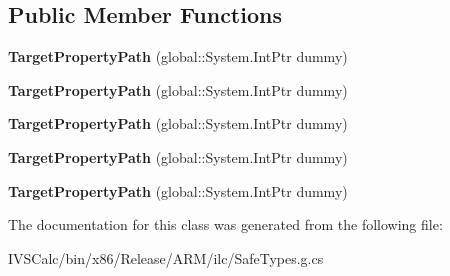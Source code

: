 \subsection*{Public Member Functions}
\begin{DoxyCompactItemize}
\item 
\mbox{\label{class_windows_1_1_u_i_1_1_xaml_1_1_target_property_path_a7f2ff6ada8a4a106f77c15ad60e847dd}} 
{\bfseries Target\+Property\+Path} (global\+::\+System.\+Int\+Ptr dummy)
\item 
\mbox{\label{class_windows_1_1_u_i_1_1_xaml_1_1_target_property_path_a7f2ff6ada8a4a106f77c15ad60e847dd}} 
{\bfseries Target\+Property\+Path} (global\+::\+System.\+Int\+Ptr dummy)
\item 
\mbox{\label{class_windows_1_1_u_i_1_1_xaml_1_1_target_property_path_a7f2ff6ada8a4a106f77c15ad60e847dd}} 
{\bfseries Target\+Property\+Path} (global\+::\+System.\+Int\+Ptr dummy)
\item 
\mbox{\label{class_windows_1_1_u_i_1_1_xaml_1_1_target_property_path_a7f2ff6ada8a4a106f77c15ad60e847dd}} 
{\bfseries Target\+Property\+Path} (global\+::\+System.\+Int\+Ptr dummy)
\item 
\mbox{\label{class_windows_1_1_u_i_1_1_xaml_1_1_target_property_path_a7f2ff6ada8a4a106f77c15ad60e847dd}} 
{\bfseries Target\+Property\+Path} (global\+::\+System.\+Int\+Ptr dummy)
\end{DoxyCompactItemize}


The documentation for this class was generated from the following file\+:\begin{DoxyCompactItemize}
\item 
I\+V\+S\+Calc/bin/x86/\+Release/\+A\+R\+M/ilc/Safe\+Types.\+g.\+cs\end{DoxyCompactItemize}
